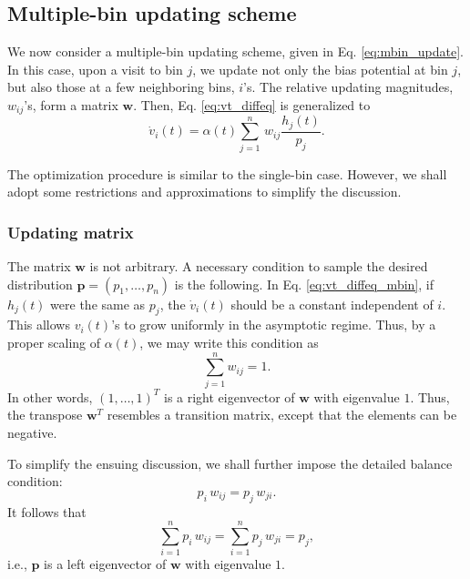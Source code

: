\documentclass[reprint, floatfix]{revtex4-1}
\begin{document}
\subsection{\label{sec:multiple-bin}
Multiple-bin updating scheme}



We now consider a multiple-bin updating scheme,
given in Eq. \eqref{eq:mbin_update}.
%
In this case,
upon a visit to bin $j$,
we update not only the bias potential at bin $j$,
but also those at a few neighboring bins, $i$'s.
%
The relative updating magnitudes,
$w_{ij}$'s,
form a matrix $\mathbf w$.
%
Then, Eq. \eqref{eq:vt_diffeq} is generalized to
\begin{equation}
  \dot v_i(t)
  =
  \alpha(t) \sum_{j=1}^n \, w_{ij} \frac{ h_j(t) } { p_j }.
  \label{eq:vt_diffeq_mbin}
\end{equation}


The optimization procedure is similar to the single-bin case.
However, we shall adopt some restrictions and approximations
to simplify the discussion.



\subsubsection{\label{sec:updating-matrix}
Updating matrix}



The matrix $\mathbf w$ is not arbitrary.
%
A necessary condition to sample
the desired distribution
$\mathbf p = (p_1, \dots, p_n)$
is the following.
%
In Eq. \eqref{eq:vt_diffeq_mbin},
if $h_j(t)$ were the same as $p_j$,
the $\dot v_i(t)$ should be a constant independent of $i$.
%
This allows $v_i(t)$'s to grow uniformly
in the asymptotic regime.
%
Thus, by a proper scaling of $\alpha(t)$,
we may write this condition as
%
\begin{equation}
  \sum_{j = 1}^n w_{ij} = 1
  .
\label{eq:w_sumj}
\end{equation}
%
In other words, $(1, \dots, 1)^T$
is a right eigenvector of $\mathbf w$
with eigenvalue $1$.
%
Thus, the transpose $\mathbf w^T$
resembles a transition matrix,
except that the elements can be negative.



To simplify the ensuing discussion,
we shall further impose the
detailed balance condition:
%
\begin{equation}
  p_i \, w_{ij} = p_j \, w_{ji}.
  \label{eq:w_detailedbalance}
\end{equation}
%
It follows that
\begin{equation}
  \sum_{i = 1}^n p_i \, w_{ij}
  =
  \sum_{i = 1}^n p_j \, w_{ji}
  = p_j,
  \label{eq:w_balance}
\end{equation}
%
i.e., $\mathbf p$ is a left eigenvector of
$\mathbf w$ with eigenvalue $1$.
\end{document}
